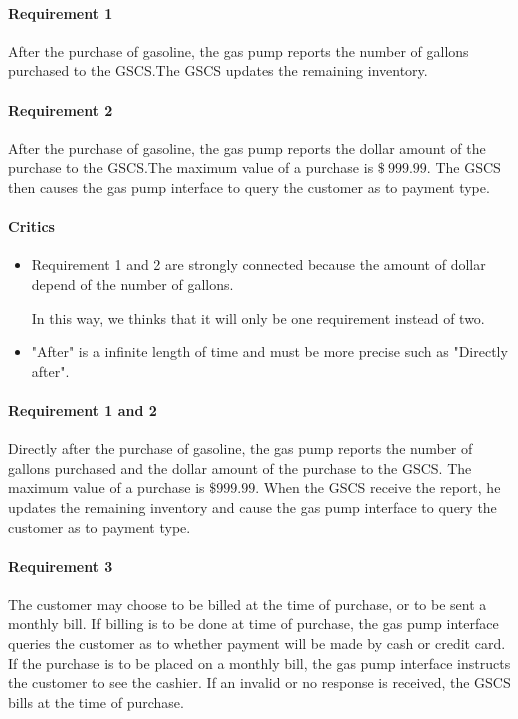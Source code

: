 
\paragraph{Requirement 1} After the purchase of gasoline, the gas pump
reports the number of gallons purchased to the GSCS.\@ The GSCS updates the
remaining inventory.

\paragraph{Requirement 2} After the purchase of gasoline, the gas pump
reports the dollar amount of the purchase to the GSCS.\@ The maximum value of
a purchase is $\$~999.99$. The GSCS then causes the gas pump interface to
query the customer as to payment type.

\begin{framed}
    \paragraph{Critics} 
    \begin{itemize}
        \item Requirement 1 and 2 are strongly connected because the
            amount of dollar depend of the number of gallons.

            In this way, we thinks that it will only be one
            requirement instead of two.

        \item "After" is a infinite length of time and must be more
            precise such as "Directly after".
    \end{itemize}

    \paragraph{Requirement 1 and 2} Directly after the purchase of gasoline,
    the gas pump reports the number of gallons purchased and the
    dollar amount of the purchase to the GSCS. The maximum value of
    a purchase is $\$999.99$. 
    When the GSCS receive the report, he updates the remaining
    inventory and cause the gas pump interface to query the customer as to
    payment type. 

\end{framed}

\paragraph{Requirement 3} The customer may choose to be billed at the time
of purchase, or to be sent a monthly bill. If billing is to be done at time
of purchase, the gas pump interface queries the customer as to whether
payment will be made by cash or credit card. If the purchase is to be placed
on a monthly bill, the gas pump interface instructs the customer to see the
cashier. If an invalid or no response is received, the GSCS bills at the
time of purchase.

